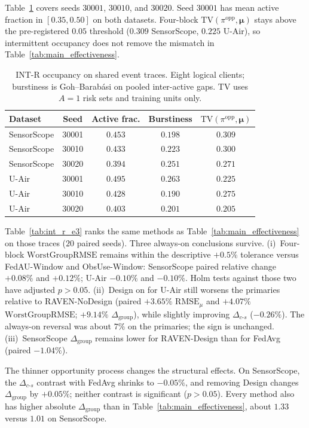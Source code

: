 Table~\ref{tab:int_r_occ} covers seeds $30001$, $30010$, and $30020$. Seed
$30001$ has mean active fraction in $[0.35,0.50]$ on both datasets.
Four-block $\mathrm{TV}(\pi^{\mathrm{opp}},\boldsymbol\mu)$ stays above the
pre-registered $0.05$ threshold ($0.309$ SensorScope, $0.225$ U-Air), so
intermittent occupancy does not remove the mismatch in
Table~\ref{tab:main_effectiveness}.

\begin{table}[!htbp]
\centering
\caption{INT-R occupancy on shared event traces.
Eight logical clients; burstiness is Goh--Barab\'asi on pooled inter-active
gaps. $\mathrm{TV}$ uses $A=1$ risk sets and training units only.}
\label{tab:int_r_occ}
\footnotesize
\begin{tabular}{lcccc}
\toprule
Dataset & Seed & Active frac. & Burstiness & $\mathrm{TV}(\pi^{\mathrm{opp}},\boldsymbol\mu)$\\
\midrule
SensorScope & 30001 & $0.453$ & $0.198$ & $0.309$\\
SensorScope & 30010 & $0.433$ & $0.223$ & $0.300$\\
SensorScope & 30020 & $0.394$ & $0.251$ & $0.271$\\
U-Air & 30001 & $0.495$ & $0.263$ & $0.225$\\
U-Air & 30010 & $0.428$ & $0.190$ & $0.275$\\
U-Air & 30020 & $0.403$ & $0.201$ & $0.205$\\
\bottomrule
\end{tabular}
\end{table}

Table~\ref{tab:int_r_e3} ranks the same methods as
Table~\ref{tab:main_effectiveness} on those traces ($20$ paired seeds).
Three always-on conclusions survive.  (i)~Four-block
$\mathrm{WorstGroupRMSE}$ remains within the descriptive $+0.5\%$
tolerance versus FedAU-Window
and ObsUse-Window: SensorScope paired relative
change $+0.08\%$ and $+0.12\%$; U-Air $-0.10\%$ and $-0.10\%$.  Holm tests
against those two have adjusted $p>0.05$.  (ii)~Design on for U-Air
still worsens the primaries relative to RAVEN-NoDesign
(paired $+3.65\%$ $\mathrm{RMSE}_{\mu}$ and $+4.07\%$
$\mathrm{WorstGroupRMSE}$; $+9.14\%$ $\Delta_{\mathrm{group}}$), while
slightly improving $\Delta_{c\text{-}s}$ ($-0.26\%$).  The always-on
reversal was about $7\%$ on the primaries; the sign is unchanged.
(iii)~SensorScope $\Delta_{\mathrm{group}}$ remains lower for
RAVEN-Design than for FedAvg (paired $-1.04\%$).

The thinner opportunity process changes the structural effects.  On
SensorScope, the $\Delta_{c\text{-}s}$ contrast with FedAvg shrinks to
$-0.05\%$, and removing Design changes $\Delta_{\mathrm{group}}$ by
$+0.05\%$; neither contrast is significant ($p>0.05$).
Every method also has higher absolute $\Delta_{\mathrm{group}}$ than in
Table~\ref{tab:main_effectiveness}, about $1.33$ versus $1.01$ on SensorScope.



